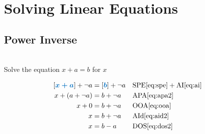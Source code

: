 \documentclass[20150903-160354-rs2.2-MarksMathNotebook.tex]{subfiles}
\begin{document}
%
%

\chapter{Solving Linear Equations}

\section{Power Inverse}

\begin{example}[id:20141206-102142] \label{20141206-102142} \hfill \\

Solve the equation $x+a=b$ for $x$

\soln

\solnsteps
\begin{align*}
\farg{x+a} + \neg a  &= \farg{b} + \neg a  && \text{SPE} \eqref{eq:spe} + \text{AI} \eqref{eq:ai} \\
x + (a+\neg a) &= b + \neg a  && \text{APA} \eqref{eq:apa2} \\
x + 0 &= b + \neg a  && \text{OOA} \eqref{eq:ooa} \\
x &= b + \neg a  && \text{AId} \eqref{eq:aid2} \\
x &= b-a  && \text{DOS} \eqref{eq:dos2}
\end{align*}
\end{example}
\end{document}
